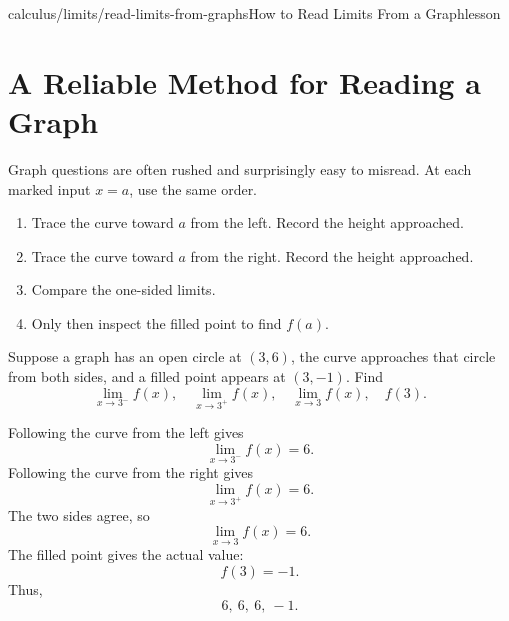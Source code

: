 \begin{webpage}{calculus/limits/read-limits-from-graphs}{How to Read Limits From a Graph}{lesson}
\section{A Reliable Method for Reading a Graph}

Graph questions are often rushed and surprisingly easy to misread. At each marked input \(x=a\), use the same order.

\begin{bgmethod}[title={Graph-Reading Routine}]
\begin{enumerate}
  \item Trace the curve toward \(a\) from the left. Record the height approached.
  \item Trace the curve toward \(a\) from the right. Record the height approached.
  \item Compare the one-sided limits.
  \item Only then inspect the filled point to find \(f(a)\).
\end{enumerate}
\end{bgmethod}

\begin{bgexample}[title={Reading four quantities from one graph}]
Suppose a graph has an open circle at \((3,6)\), the curve approaches that circle from both sides, and a filled point appears at \((3,-1)\). Find
\[
  \lim_{x\to3^-}f(x),\quad
  \lim_{x\to3^+}f(x),\quad
  \lim_{x\to3}f(x),\quad
  f(3).
\]

\begin{bgsolution}
Following the curve from the left gives
\[
  \lim_{x\to3^-}f(x)=6.
\]
Following the curve from the right gives
\[
  \lim_{x\to3^+}f(x)=6.
\]
The two sides agree, so
\[
  \lim_{x\to3}f(x)=6.
\]
The filled point gives the actual value:
\[
  f(3)=-1.
\]
Thus,
\[
  \boxed{6,\ 6,\ 6,\ -1}.
\]
\end{bgsolution}
\end{bgexample}
\end{webpage}

